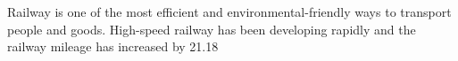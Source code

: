 Railway is one of the most efficient and environmental-friendly ways to transport people and goods. High-speed railway has been developing rapidly and the railway mileage has increased by 21.18%